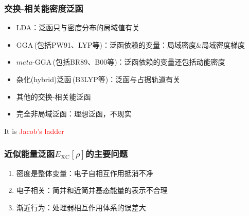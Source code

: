 \documentclass[cjk,slidestop,compress,mathserif,blue]{beamer}
\begin{document}
{
\frametitle{交换-相关能密度泛函}
\vskip 10pt
 \begin{itemize}%
   \setlength{\itemsep}{10pt}
 \item \textrm{LDA}：泛函只与密度分布的局域值有关
 \item \textrm{GGA}\,(包括\textrm{PW91}、\textrm{LYP}等)：泛函依赖的变量：局域密度\&局域密度梯度
 \item $meta$-\textrm{GGA}\,(包括\textrm{BR89}、\textrm{B00}等)：泛函依赖的变量还包括动能密度
 \item 杂化(\textrm{hybrid})泛函\,(\textrm{B3LYP}等)：泛函与占据轨道有关
 \item 其他的交换-相关能泛函
 \item 完全非局域泛函：\;\;理想泛函，不现实
   \end{itemize}
   \textrm{\huge It is \textcolor{red}{Jacob's ladder}}
}

\frame                               %
{
	\frametitle{近似能量泛函$E_{\mathrm{XC}}[\rho]$的主要问题}
\vskip 20pt
\begin{enumerate}%
   \setlength{\itemsep}{30pt}
 \item  密度是整体变量：电子自相互作用抵消不净%
 \item  电子相关：简并和近简并基态能量的表示不合理
 \item  渐近行为：处理弱相互作用体系的误差大
 \end{enumerate}
}

\end{document}
